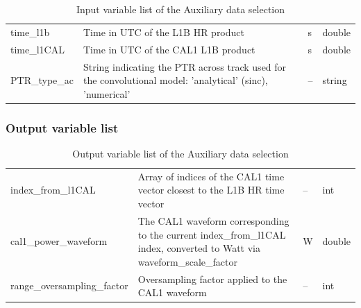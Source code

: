 \documentclass[11pt,a4paper]{article}
\begin{document}
\begin{table}[ht!]
     \centering 
     \caption[Input variable list of the Auxiliary data selection]{Input variable list of the Auxiliary data selection}\label{tab:input_var_aux_data_selection}
\begin{tabular}{|m{}|m{}|m{}|m{}|}
  \hline
  \centering \cellcolor{dark_red} \color{white}{\bf Field name} & \centering \cellcolor{dark_red} \color{white}{\bf Description} & \cellcolor{dark_red} \color{white}{\bf Units} & \cellcolor{dark_red} \color{white}{\bf Type}\\
  \hline
  time\_l1b & Time in UTC of the L1B HR product & s & double \\
  \hline
  time\_l1CAL & Time in UTC of the CAL1 L1B product & s & double \\
  \hline
  PTR\_type\_ac & String indicating the PTR across track used for the convolutional model: 'analytical' (sinc), 'numerical' & -- & string \\

    \hline
  
\end{tabular}
\end{table}

\subsubsection{Output variable list}\label{sec:output_var_aux_data_selection}

\begin{table}[ht!]
     \centering 
     \caption[Output variable list of the Auxiliary data selection]{Output variable list of the Auxiliary data selection}\label{tab:output_var_aux_data_selection}
\begin{tabular}{|m{}|m{}|m{}|m{}|}
  \hline
  \centering \cellcolor{dark_red} \color{white}{\bf Field name} & \centering \cellcolor{dark_red} \color{white}{\bf Description} & \cellcolor{dark_red} \color{white}{\bf Units} & \cellcolor{dark_red} \color{white}{\bf Type}\\
  \hline
  index\_from\_l1CAL & Array of indices of the CAL1 time vector closest to the L1B HR time vector & -- & int \\
    \hline
  cal1\_power\_waveform & The CAL1 waveform corresponding to the current index\_from\_l1CAL index, converted to Watt via waveform\_scale\_factor & W & double\\
  \hline
  range\_oversampling\_factor & Oversampling factor applied to the CAL1 waveform & -- & int \\
    \hline
\end{tabular}
\end{table}
\end{document}
